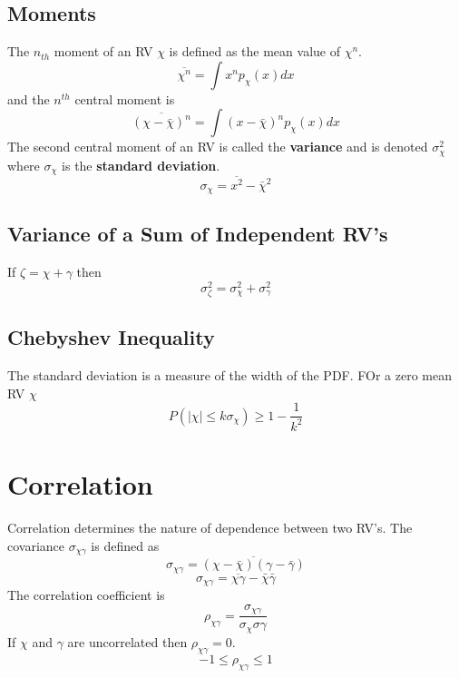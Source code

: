 \documentclass{article}
\begin{document}
    \subsection{Moments}
    The $n_{th}$ moment of an RV $\chi$ is defined as the mean value of $\chi^n$.
    \begin{equation}
        \overline{\chi^n} = \int x^np_{\chi}(x)dx
    \end{equation}
    and the $n^{th}$ central moment is
    \begin{equation}
        \overline{(\chi-\bar{\chi})^n} = \int (x - \bar{\chi})^np_{\chi}(x)dx
    \end{equation}
    The second central moment of an RV is called the \textbf{variance} and is denoted $\sigma_{\chi}^2$ where 
    $\sigma_{\chi}$ is the \textbf{standard deviation}.
    \begin{equation}
        \sigma_{\chi} = \overline{x^2} - \bar{\chi}^2
    \end{equation}
    \subsection{Variance of a Sum of Independent RV's}
    If $\zeta = \chi + \gamma$ then
    \begin{equation}
        \sigma_{\zeta}^2 = \sigma_{\chi}^2 + \sigma_{\gamma}^2
    \end{equation}

    \subsection{Chebyshev Inequality}
    The standard deviation is a measure of the width of the PDF. FOr a zero mean RV $\chi$
    \begin{equation}
        P(|\chi| \le k\sigma_{\chi}) \ge 1 - \frac{1}{k^2}
    \end{equation}

    \section{Correlation}
    Correlation determines the nature of dependence between two RV's. The covariance $\sigma_{\chi\gamma}$ is defined as
    \begin{equation}
        \sigma_{\chi\gamma} = \overline{(\chi-\bar{\chi})(\gamma-\bar{\gamma})}
    \end{equation}
    \begin{equation}
        \sigma_{\chi\gamma} = \overline{\chi\gamma} - \bar{\chi}\bar{\gamma}
    \end{equation}
    The correlation coefficient is
    \begin{equation}
        \rho_{\chi\gamma} = \frac{\sigma_{\chi\gamma}}{\sigma_{\chi}\sigma{\gamma}}
    \end{equation}
    If $\chi$ and $\gamma$ are uncorrelated then $\rho_{\chi\gamma} = 0$.
    \begin{equation}
        -1 \le \rho_{\chi\gamma} \le 1
    \end{equation}
\end{document}
